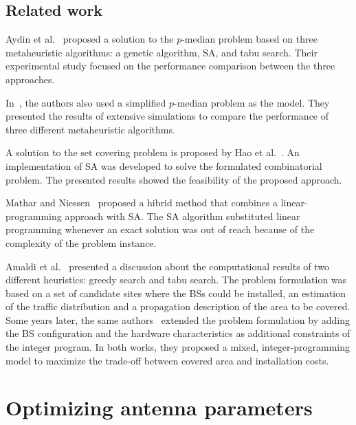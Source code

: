 \subsection*{Related work}

Aydin et al.~\cite{Aydin:Heuristic.Optimization.Of.WCDMA} proposed
a solution to the $p$-median problem based on three metaheuristic
algorithms: a genetic algorithm, SA, and tabu search. Their experimental
study focused on the performance comparison between the three approaches.

In~\cite{Yang-UMTS_base_station_location_planning:2007}, the authors
also used a simplified $p$-median problem as the model. They presented
the results of extensive simulations to compare the performance of
three different metaheuristic algorithms.

A solution to the set covering problem is proposed by Hao et al.~\cite{minimum.set.covering.problem:1997}.
An implementation of SA was developed to solve the formulated combinatorial
problem. The presented results showed the feasibility of the proposed
approach. 

Mathar and Niessen~\cite{minimum.set.covering.problem:2000} proposed
a hibrid method that combines a linear-programming approach with SA.
The SA algorithm substituted linear programming whenever an exact
solution was out of reach because of the complexity of the problem
instance.

Amaldi et al.~\cite{Amaldi-Planning_UMTS_base_station_locations:2003}
presented a discussion about the computational results of two different
heuristics: greedy search and tabu search. The problem formulation
was based on a set of candidate sites where the BSs could be installed,
an estimation of the traffic distribution and a propagation description
of the area to be covered. Some years later, the same authors~\cite{Amaldi-Radio_planning_and_coverage_optimization_of_3G_networks:2008}
extended the problem formulation by adding the BS configuration and
the hardware characteristics as additional constraints of the integer
program. In both works, they proposed a mixed, integer-programming
model to maximize the trade-off between covered area and installation
costs.




\section{Optimizing antenna parameters}

